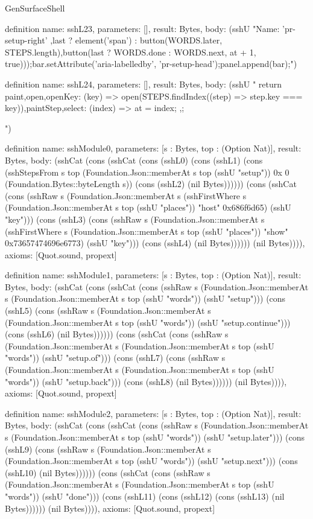 \begin{lexlean}{GenSurfaceShell}
\begin{semanticmodule}
{{{definition{
  name: sshL23,
  parameters: [],
  result: Bytes,
  body: (sshU "Name: 'pr-setup-right' },\n        last ? element('span') : button(WORDS.later, STEPS.length),\n        button(last ? WORDS.done : WORDS.next, at + 1, true)));\n    bar.setAttribute('aria-labelledby', 'pr-setup-head');\n    panel.append(bar);\n ")
}

definition{
  name: sshL24,
  parameters: [],
  result: Bytes,
  body: (sshU " }\n  return {\n    paint,\n    open,\n    openKey: (key) => open(STEPS.findIndex((step) => step.key === key)),\n    paintStep,\n    select: (index) => { at = index; },\n  };\n}\n")
}

definition{
  name: sshModule0,
  parameters: [s : Bytes, top : (Option Nat)],
  result: Bytes,
  body: (sshCat (cons (sshCat (cons (sshL0) (cons (sshL1) (cons (sshStepsFrom s top (Foundation.Json::memberAt s top (sshU "setup")) 0x 0 (Foundation.Bytes::byteLength s)) (cons (sshL2) (nil Bytes)))))) (cons (sshCat (cons (sshRaw s (Foundation.Json::memberAt s (sshFirstWhere s (Foundation.Json::memberAt s top (sshU "places")) "host" 0x686f6d65) (sshU "key"))) (cons (sshL3) (cons (sshRaw s (Foundation.Json::memberAt s (sshFirstWhere s (Foundation.Json::memberAt s top (sshU "places")) "show" 0x73657474696e6773) (sshU "key"))) (cons (sshL4) (nil Bytes)))))) (nil Bytes)))),
  axioms: [Quot.sound, propext]
}

definition{
  name: sshModule1,
  parameters: [s : Bytes, top : (Option Nat)],
  result: Bytes,
  body: (sshCat (cons (sshCat (cons (sshRaw s (Foundation.Json::memberAt s (Foundation.Json::memberAt s top (sshU "words")) (sshU "setup"))) (cons (sshL5) (cons (sshRaw s (Foundation.Json::memberAt s (Foundation.Json::memberAt s top (sshU "words")) (sshU "setup.continue"))) (cons (sshL6) (nil Bytes)))))) (cons (sshCat (cons (sshRaw s (Foundation.Json::memberAt s (Foundation.Json::memberAt s top (sshU "words")) (sshU "setup.of"))) (cons (sshL7) (cons (sshRaw s (Foundation.Json::memberAt s (Foundation.Json::memberAt s top (sshU "words")) (sshU "setup.back"))) (cons (sshL8) (nil Bytes)))))) (nil Bytes)))),
  axioms: [Quot.sound, propext]
}

definition{
  name: sshModule2,
  parameters: [s : Bytes, top : (Option Nat)],
  result: Bytes,
  body: (sshCat (cons (sshCat (cons (sshRaw s (Foundation.Json::memberAt s (Foundation.Json::memberAt s top (sshU "words")) (sshU "setup.later"))) (cons (sshL9) (cons (sshRaw s (Foundation.Json::memberAt s (Foundation.Json::memberAt s top (sshU "words")) (sshU "setup.next"))) (cons (sshL10) (nil Bytes)))))) (cons (sshCat (cons (sshRaw s (Foundation.Json::memberAt s (Foundation.Json::memberAt s top (sshU "words")) (sshU "done"))) (cons (sshL11) (cons (sshL12) (cons (sshL13) (nil Bytes)))))) (nil Bytes)))),
  axioms: [Quot.sound, propext]
}


\end{semanticmodule}
\end{lexlean}
